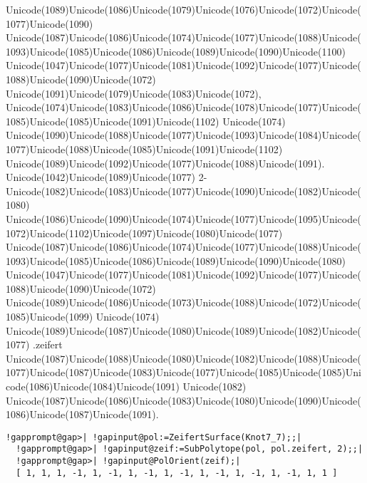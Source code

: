 \documentclass[a4paper,11pt]{report}
\begin{document}
{{{ Unicode(1089)Unicode(1086)Unicode(1079)Unicode(1076)Unicode(1072)Unicode(1077)Unicode(1090)
Unicode(1087)Unicode(1086)Unicode(1074)Unicode(1077)Unicode(1088)Unicode(1093)Unicode(1085)Unicode(1086)Unicode(1089)Unicode(1090)Unicode(1100)
Unicode(1047)Unicode(1077)Unicode(1081)Unicode(1092)Unicode(1077)Unicode(1088)Unicode(1090)Unicode(1072)
Unicode(1091)Unicode(1079)Unicode(1083)Unicode(1072),
Unicode(1074)Unicode(1083)Unicode(1086)Unicode(1078)Unicode(1077)Unicode(1085)Unicode(1085)Unicode(1091)Unicode(1102)
Unicode(1074)
Unicode(1090)Unicode(1088)Unicode(1077)Unicode(1093)Unicode(1084)Unicode(1077)Unicode(1088)Unicode(1085)Unicode(1091)Unicode(1102)
Unicode(1089)Unicode(1092)Unicode(1077)Unicode(1088)Unicode(1091).
Unicode(1042)Unicode(1089)Unicode(1077)
2-Unicode(1082)Unicode(1083)Unicode(1077)Unicode(1090)Unicode(1082)Unicode(1080)
Unicode(1086)Unicode(1090)Unicode(1074)Unicode(1077)Unicode(1095)Unicode(1072)Unicode(1102)Unicode(1097)Unicode(1080)Unicode(1077)
Unicode(1087)Unicode(1086)Unicode(1074)Unicode(1077)Unicode(1088)Unicode(1093)Unicode(1085)Unicode(1086)Unicode(1089)Unicode(1090)Unicode(1080)
Unicode(1047)Unicode(1077)Unicode(1081)Unicode(1092)Unicode(1077)Unicode(1088)Unicode(1090)Unicode(1072)
Unicode(1089)Unicode(1086)Unicode(1073)Unicode(1088)Unicode(1072)Unicode(1085)Unicode(1099)
Unicode(1074)
Unicode(1089)Unicode(1087)Unicode(1080)Unicode(1089)Unicode(1082)Unicode(1077)
.zeifert
Unicode(1087)Unicode(1088)Unicode(1080)Unicode(1082)Unicode(1088)Unicode(1077)Unicode(1087)Unicode(1083)Unicode(1077)Unicode(1085)Unicode(1085)Unicode(1086)Unicode(1084)Unicode(1091)
Unicode(1082)
Unicode(1087)Unicode(1086)Unicode(1083)Unicode(1080)Unicode(1090)Unicode(1086)Unicode(1087)Unicode(1091). 
\begin{Verbatim}[commandchars=!@|,fontsize=\small,frame=single,label=Пример]
  !gapprompt@gap>| !gapinput@pol:=ZeifertSurface(Knot7_7);;|
  !gapprompt@gap>| !gapinput@zeif:=SubPolytope(pol, pol.zeifert, 2);;|
  !gapprompt@gap>| !gapinput@PolOrient(zeif);|
  [ 1, 1, 1, -1, 1, -1, 1, -1, 1, -1, 1, -1, 1, -1, 1, -1, 1, 1 ]
  					

\end{Verbatim}}}}
\end{document}
